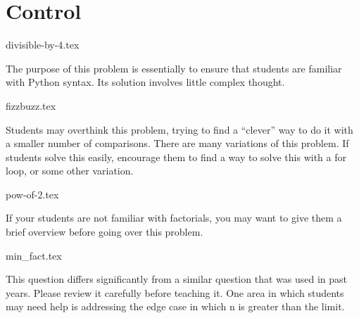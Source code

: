 \documentclass{exam}
\begin{document}
\section{Control}
\begin{questions}
{divisible-by-4.tex}
\begin{questionmeta}
  The purpose of this problem is essentially to ensure that students are familiar with Python syntax. Its solution involves little complex thought. 
\end{questionmeta}
{fizzbuzz.tex} 
\begin{questionmeta}
  Students may overthink this problem, trying to find a ``clever'' way to do it with a smaller number of comparisons.
  There are many variations of this problem. If students solve this easily, encourage them to find a way to solve this with a for loop, or some other variation.
\end{questionmeta}
{pow-of-2.tex}
\begin{questionmeta}
  If your students are not familiar with factorials, you may want to give them a brief overview before going over this problem. 
\end{questionmeta}
{min_fact.tex}
\begin{questionmeta}
  This question differs significantly from a similar question that was used in past years. Please review it carefully before teaching it.
  One area in which students may need help is addressing the edge case in which n is greater than the limit.
\end{questionmeta}
\end{questions}
\end{document}
